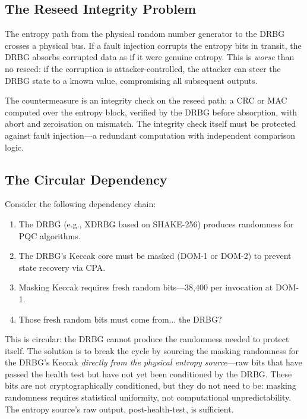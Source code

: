 \subsection{The Reseed Integrity Problem}
\label{subsec:reseed-integrity}

The entropy path from the physical random number generator to the DRBG crosses a physical bus.  If a fault injection corrupts the entropy bits in transit, the DRBG absorbs corrupted data as if it were genuine entropy.  This is \emph{worse} than no reseed: if the corruption is attacker-controlled, the attacker can steer the DRBG state to a known value, compromising all subsequent outputs.

The countermeasure is an integrity check on the reseed path: a CRC or MAC computed over the entropy block, verified by the DRBG before absorption, with abort and zeroisation on mismatch.  The integrity check itself must be protected against fault injection---a redundant computation with independent comparison logic.

\subsection{The Circular Dependency}
\label{subsec:circular-dependency}

Consider the following dependency chain:
\begin{enumerate}
\item The DRBG (e.g., XDRBG based on SHAKE-256) produces randomness for PQC algorithms.
\item The DRBG's Keccak core must be masked (DOM-1 or DOM-2) to prevent state recovery via CPA.
\item Masking Keccak requires fresh random bits---38,400 per invocation at DOM-1.
\item Those fresh random bits must come from... the DRBG?
\end{enumerate}

This is circular: the DRBG cannot produce the randomness needed to protect itself.  The solution is to break the cycle by sourcing the masking randomness for the DRBG's Keccak \emph{directly from the physical entropy source}---raw bits that have passed the health test but have not yet been conditioned by the DRBG.  These bits are not cryptographically conditioned, but they do not need to be: masking randomness requires statistical uniformity, not computational unpredictability.  The entropy source's raw output, post-health-test, is sufficient.

